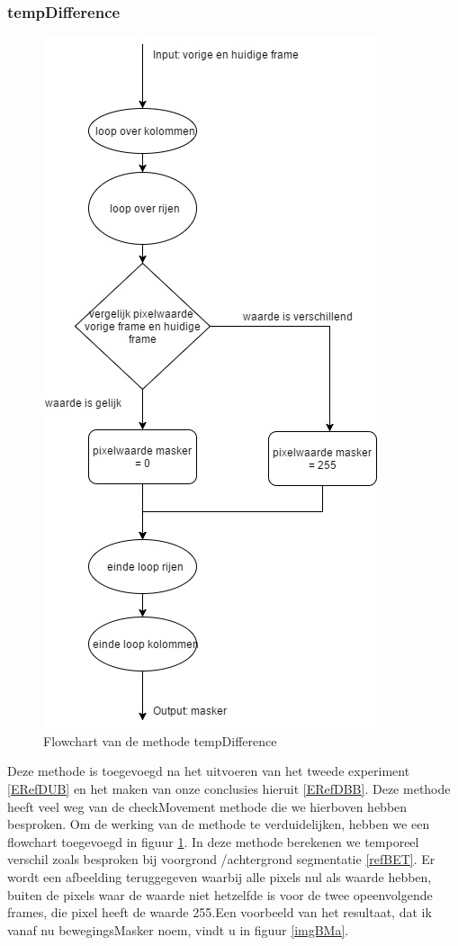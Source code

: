 \subsubsection{tempDifference}
\begin{figure}[hbp]
	\includegraphics[scale=0.45]{FlowChart_TempDifference}
	\caption{Flowchart van de methode tempDifference}
	\label{imgFCTDi}
\end{figure}
Deze methode is toegevoegd na het uitvoeren van het tweede experiment \ref{ERefDUB} en het maken van onze conclusies hieruit \ref{ERefDBB}. Deze methode heeft veel weg van de checkMovement methode die we hierboven hebben besproken. Om de werking van de methode te verduidelijken, hebben we een flowchart toegevoegd in figuur \ref{imgFCTDi}. In deze methode berekenen we temporeel verschil zoals besproken bij voorgrond /achtergrond segmentatie \ref{refBET}. Er wordt een afbeelding teruggegeven waarbij alle pixels nul als waarde hebben, buiten de pixels waar de waarde niet hetzelfde is voor de twee opeenvolgende frames, die pixel heeft de waarde 255.Een voorbeeld van het resultaat, dat ik vanaf nu bewegingsMasker noem, vindt u in figuur \ref{imgBMa}. \\
